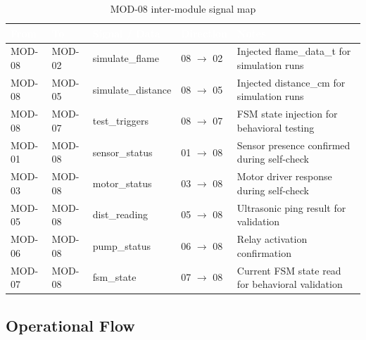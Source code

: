 \documentclass[12pt,a4paper]{article}
\newcommand{\theadtext}[1]{\textcolor{white}{\textbf{#1}}}
\newcommand{\fn}[1]{{\footnotesize\ttfamily #1}}
\begin{document}
\begin{table}[H]
\centering\small
\begin{tabularx}{\textwidth}{L{2cm} L{2cm} L{4cm} L{2.5cm} X}
\toprule
{}
\theadtext{From} & \theadtext{To} & \theadtext{Signal / Data} & \theadtext{Direction} & \theadtext{Notes} \\
\midrule
{}   \fn{MOD-08} & \fn{MOD-02} & \fn{simulate\_flame}    & 08 $\rightarrow$ 02 & Injected \fn{flame\_data\_t} for simulation runs \\
 \fn{MOD-08} & \fn{MOD-05} & \fn{simulate\_distance} & 08 $\rightarrow$ 05 & Injected \fn{distance\_cm} for simulation runs \\
   \fn{MOD-08} & \fn{MOD-07} & \fn{test\_triggers}     & 08 $\rightarrow$ 07 & FSM state injection for behavioral testing \\
 \fn{MOD-01} & \fn{MOD-08} & \fn{sensor\_status}     & 01 $\rightarrow$ 08 & Sensor presence confirmed during self-check \\
   \fn{MOD-03} & \fn{MOD-08} & \fn{motor\_status}      & 03 $\rightarrow$ 08 & Motor driver response during self-check \\
 \fn{MOD-05} & \fn{MOD-08} & \fn{dist\_reading}      & 05 $\rightarrow$ 08 & Ultrasonic ping result for validation \\
   \fn{MOD-06} & \fn{MOD-08} & \fn{pump\_status}       & 06 $\rightarrow$ 08 & Relay activation confirmation \\
 \fn{MOD-07} & \fn{MOD-08} & \fn{fsm\_state}         & 07 $\rightarrow$ 08 & Current FSM state read for behavioral validation \\
\bottomrule
\end{tabularx}
\caption{MOD-08 inter-module signal map}
\end{table}


\subsection{Operational Flow}
\end{document}
